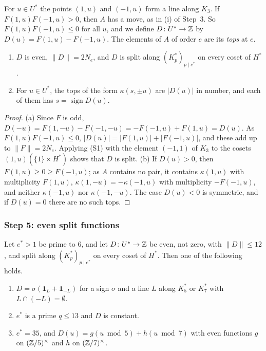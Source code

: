 For $u\in U^{*}$ the points $(1,u)$ and $(-1,u)$ form a line along $K_{3}$.
If $F(1,u)F(-1,u)>0$, then $A$ has a move, as in (i) of Step~3. So
$F(1,u)F(-1,u)\le0$ for all $u$, and we define $D\colon U^{*}\to\mathbb{Z}$ by
$D(u)=F(1,u)-F(-1,u)$. The elements of $A$ of order $e$ are its \emph{tops}
at $e$.

\begin{lemma}\label{lem:tops}
\begin{enumerate}[label=\textup{(\alph*)}]
\item $D$ is even, $\|D\|=2N_{e}$, and $D$ is split along
$(K^{*}_{p})_{p\mid e^{*}}$ on every coset of $H^{*}$.
\item For $u\in U^{*}$, the tops of the form $\kappa(s,\pm u)$ are
$|D(u)|$ in number, and each of them has $s=\operatorname{sign}D(u)$.
\end{enumerate}
\end{lemma}

\begin{proof}
(a) Since $F$ is odd, $D(-u)=F(1,-u)-F(-1,-u)=-F(-1,u)+F(1,u)=D(u)$. As
$F(1,u)F(-1,u)\le0$,
$|D(u)|=|F(1,u)|+|F(-1,u)|$, and these add up to $\|F\|=2N_{e}$. Applying (S1)
with the element $(-1,1)$ of $K_{3}$ to the cosets $(1,u)(\{1\}\times H^{*})$
shows that $D$ is split. (b) If $D(u)>0$, then $F(1,u)\ge0\ge F(-1,u)$; as $A$
contains no pair, it contains $\kappa(1,u)$ with multiplicity $F(1,u)$,
$\kappa(1,-u)=-\kappa(-1,u)$ with multiplicity $-F(-1,u)$, and neither
$\kappa(-1,u)$ nor $\kappa(-1,-u)$. The case $D(u)<0$ is symmetric, and if
$D(u)=0$ there are no such tops.
\end{proof}

\subsubsection*{Step 5: even split functions}

\begin{lemma}\label{lem:even}
Let $e^{*}>1$ be prime to $6$, and let $D\colon U^{*}\to\mathbb{Z}$ be even, not
zero, with $\|D\|\le12$, and split along $(K^{*}_{p})_{p\mid e^{*}}$ on every
coset of $H^{*}$. Then one of the following holds.
\begin{enumerate}[label=\textup{(E\arabic*)}]
\item $D=\sigma(\mathbf 1_{L}+\mathbf 1_{-L})$ for a sign $\sigma$ and a
line $L$ along $K^{*}_{5}$ or $K^{*}_{7}$ with $L\cap(-L)=\emptyset$.
\item $e^{*}$ is a prime $q\le13$ and $D$ is constant.
\item $e^{*}=35$, and $D(u)=g(u\bmod5)+h(u\bmod7)$ with even functions $g$ on
$(\mathbb{Z}/5)^{\times}$ and $h$ on $(\mathbb{Z}/7)^{\times}$.
\end{enumerate}
\end{lemma}


